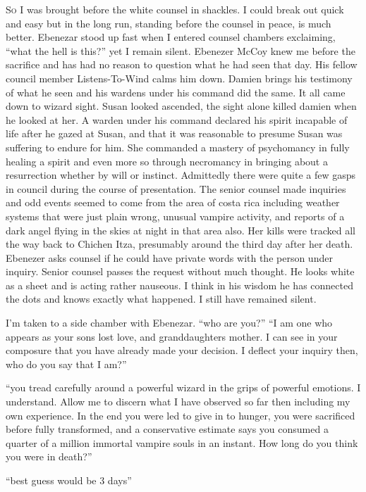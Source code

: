 \lettrine[lines=2,lraise=0]{S}o I was brought before the white counsel in shackles. I could break out quick and easy but in the long run, standing before the counsel in peace, is much better. Ebenezar stood up fast when I entered counsel chambers exclaiming, ``what the hell is this?'' yet I remain silent. Ebenezer McCoy knew me before the sacrifice and has had no reason to question what he had seen that day. His fellow council member Listens-To-Wind calms him down. Damien brings his testimony of what he seen and his wardens under his command did the same. It all came down to wizard sight. Susan looked ascended, the sight alone killed damien when he looked at her. A warden under his command declared his spirit incapable of life after he gazed at Susan, and that it was reasonable to presume Susan was suffering to endure for him. She commanded a mastery of psychomancy in fully healing a spirit and even more so through necromancy in bringing about a resurrection whether by will or instinct. Admittedly there were quite a few gasps in council during the course of presentation. The senior counsel made inquiries and odd events seemed to come from the area of costa rica including weather systems that were just plain wrong, unusual vampire activity, and reports of a dark angel flying in the skies at night in that area also. Her kills were tracked all the way back to Chichen Itza, presumably around the third day after her death. Ebenezer asks counsel if he could have private words with the person under inquiry. Senior counsel passes the request without much thought. He looks white as a sheet and is acting rather nauseous. I think in his wisdom he has connected the dots and knows exactly what happened. I still have remained silent. 

I'm taken to a side chamber with Ebenezar. ``who are you?''
``I am one who appears as your sons lost love, and granddaughters mother. I can see in your composure that you have already made your decision. I deflect your inquiry then, who do you say that I am?''

``you tread carefully around a powerful wizard in the grips of powerful emotions. I understand. Allow me to discern what I have observed so far then including my own experience. In the end you were led to give in to hunger, you were sacrificed before fully transformed, and a conservative estimate says you consumed a quarter of a million immortal vampire souls in an instant. How long do you think you were in death?''

``best guess would be 3 days''

